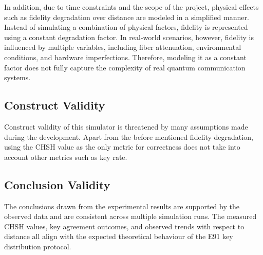 In addition, due to time constraints and the scope of the project, physical effects such as fidelity degradation over distance are modeled in a simplified manner. Instead of simulating a combination of physical factors, fidelity is represented using a constant degradation factor. In real-world scenarios, however, fidelity is influenced by multiple variables, including fiber attenuation, environmental conditions, and hardware imperfections. Therefore, modeling it as a constant factor does not fully capture the complexity of real quantum communication systems.

\subsection{Construct Validity}

Construct validity of this simulator is threatened by many assumptions made during the development. Apart from the before mentioned fidelity degradation, using the CHSH value as the only metric for correctness does not take into account other metrics such as key rate. 

\subsection{Conclusion Validity}

The conclusions drawn from the experimental results are supported by the observed data and are consistent across multiple simulation runs. The measured CHSH values, key agreement outcomes, and observed trends with respect to distance all align with the expected theoretical behaviour of the E91 key distribution protocol. 
